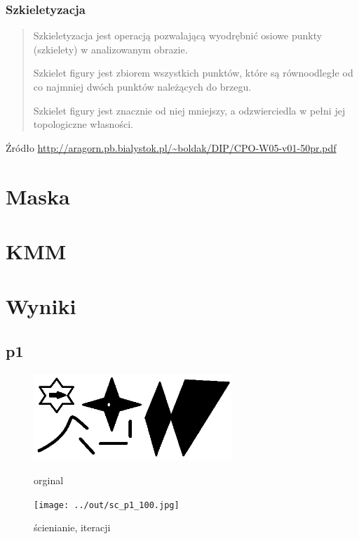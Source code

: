 \documentclass[a4paper,12pt]{article}
\begin{document}
\subsubsection{Szkieletyzacja}
\begin{quote}
Szkieletyzacja jest operacją pozwalającą wyodrębnić osiowe punkty
(szkielety) w analizowanym obrazie.

Szkielet figury jest zbiorem wszystkich punktów, które są
równoodległe od co najmniej dwóch punktów należących
do brzegu.

Szkielet figury jest znacznie od niej mniejszy, a odzwierciedla w pełni jej
topologiczne własności.
\end{quote}
Źródło \url{http://aragorn.pb.bialystok.pl/~boldak/DIP/CPO-W05-v01-50pr.pdf}


\section{Maska}



\section{KMM}




\section{Wyniki}

\newpage
\subsection{p1}

\begin{figure}[h!]
\begin{minipage}[t]{7.5cm}
\begin{center}
\includegraphics[width=7.5cm]{../in/p1.jpg}
\caption{orginal}
\end{center}
\end{minipage}
\hfill
\begin{minipage}[t]{7.5cm}
\begin{center}
\texttt{[image: ../out/sc\_p1\_100.jpg]}
\caption{ścienianie, \protect iteracji}
\end{center}
\end{minipage}
\end{figure}
\end{document}
